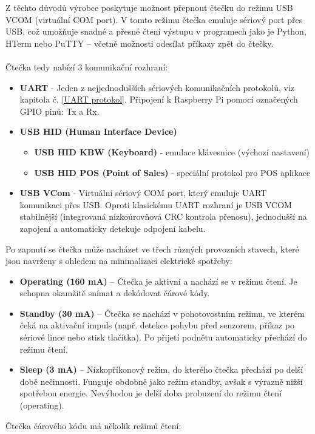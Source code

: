 Z těchto důvodů výrobce poskytuje možnost přepnout čtečku do režimu USB VCOM (virtuální COM port). V tomto režimu čtečka emuluje sériový port přes USB, což umožňuje snadné a přesné čtení výstupu v programech jako je Python, HTerm nebo PuTTY – včetně možnosti odesílat příkazy zpět do čtečky.
\\\\
Čtečka tedy nabízí 3 komunikační rozhraní:
\begin{itemize}
    \item \textbf{UART} - Jeden z nejjednodušších sériových komunikačních protokolů, viz kapitola č. \ref{UART protokol}. Připojení k Raspberry Pi pomocí označených GPIO pinů: Tx a Rx. 
    \item \textbf{USB HID (Human Interface Device)}
    \begin{itemize}
        \item \textbf{USB HID KBW (Keyboard)} - emulace klávesnice (výchozí nastavení)
        \item \textbf{USB HID POS (Point of Sales)} - speciální protokol pro POS aplikace 
    \end{itemize}
    \item \textbf{USB VCom} - Virtuální sériový COM port, který emuluje UART komunikaci přes USB. Oproti klasickému UART rozhraní je USB VCOM stabilnější (integrovaná nízkoúrovňová CRC kontrola přenosu), jednodušší na zapojení a automaticky detekuje odpojení kabelu.
\end{itemize}
\bigskip
Po zapnutí se čtečka může nacházet ve třech různých provozních stavech, které jsou navrženy s ohledem na minimalizaci elektrické spotřeby:
\begin{itemize}
    \item \textbf{Operating (160 mA)} – Čtečka je aktivní a nachází se v režimu čtení. Je schopna okamžitě snímat a dekódovat čárové kódy.
    \item \textbf{Standby (30 mA)} – Čtečka se nachází v pohotovostním režimu, ve kterém čeká na aktivační impuls (např. detekce pohybu před senzorem, příkaz po sériové lince nebo stisk tlačítka). Po přijetí podnětu automaticky přechází do režimu čtení.
    \item \textbf{Sleep (3 mA)} – Nízkopříkonový režim, do kterého čtečka přechází po delší době nečinnosti. Funguje obdobně jako režim standby, avšak s výrazně nižší spotřebou energie. Nevýhodou je delší doba probuzení do režimu čtení (operating).
\end{itemize}
\bigskip
Čtečka čárového kódu má několik režimů čtení:
